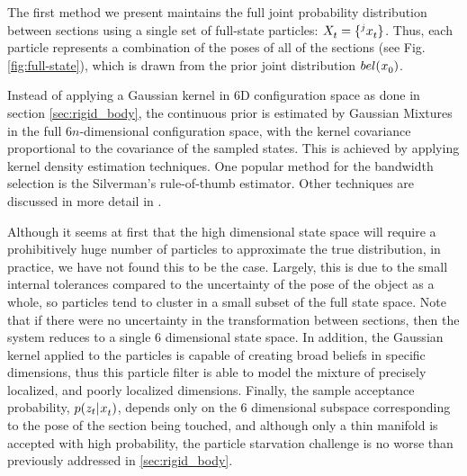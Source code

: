 \documentclass[letterpaper, 10 pt, conference]{ieeeconf}
\begin{document}
The first method we present maintains the full joint probability distribution between sections using a single set of full-state particles: $\particles[t] = \{\particle[t][j]\}$. 
Thus, each particle represents a combination of the poses of all of the sections (see Fig. \ref{fig:full-state}), which is drawn from the prior joint distribution $bel(\particle[0])$.

Instead of applying a Gaussian kernel in 6D configuration space as done in section \ref{sec:rigid_body}, the continuous prior is estimated by Gaussian Mixtures in the full $6n$-dimensional configuration space, with the kernel covariance proportional to the covariance of the sampled states. This is achieved by applying kernel density estimation techniques. One popular method for the bandwidth selection is the Silverman's rule-of-thumb estimator\cite{Silverman1986}. Other techniques are discussed in more detail in \cite{sheather2004density}.


Although it seems at first that the high dimensional state space will require a prohibitively huge number of particles to approximate the true distribution, in practice, we have not found this to be the case. 
Largely, this is due to the small internal tolerances compared to the uncertainty of the pose of the object as a whole, so particles tend to cluster in a small subset of the full state space. 
Note that if there were no uncertainty in the transformation between sections, then the system reduces to a single 6 dimensional state space.
In addition, the Gaussian kernel applied to the particles is capable of creating broad beliefs in specific dimensions\cite{Saund2017}, thus this particle filter is able to model the mixture of precisely localized, and poorly localized dimensions. 
Finally, the sample acceptance probability, $p(z_t|\particle[t])$, depends only on the 6 dimensional subspace corresponding to the pose of the section being touched, and although only a thin manifold is accepted with high probability, the particle starvation challenge is no worse than previously addressed in \ref{sec:rigid_body}.
\end{document}
